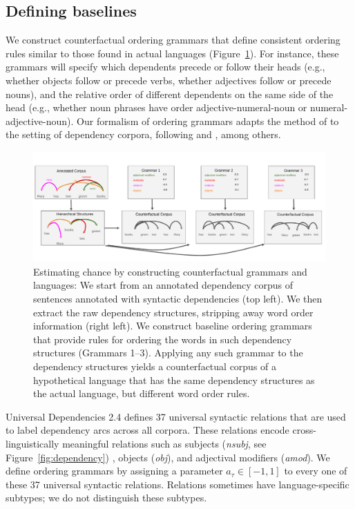 \subsection{Defining baselines}

We construct counterfactual ordering grammars that define consistent ordering rules similar to those found in actual languages (Figure~\ref{fig:grammars}).
For instance, these grammars will specify which dependents precede or follow their heads (e.g., whether objects follow or precede verbs, whether adjectives follow or precede nouns), and the relative order of different dependents on the same side of the head (e.g., whether noun phrases have order adjective-numeral-noun or numeral-adjective-noun). Our formalism of ordering grammars adapts the method of \citet{gildea-optimizing-2007,gildea-grammars-2010,gildea-human-2015} to the setting of dependency corpora, following \citet{futrell-large-scale-2015} and \citet{hahn2020universals}, among others.


\begin{figure}
\centering
\includegraphics[width=\textwidth]{figures-gdrive/counterfactual-languages.pdf}
\caption{Estimating chance by constructing counterfactual grammars and languages: We start from an annotated dependency corpus of sentences annotated with syntactic dependencies (top left). We then extract the raw dependency structures, stripping away word order information (right left).
We construct baseline ordering grammars that provide rules for ordering the words in such dependency structures (Grammars 1--3).
Applying any such grammar to the dependency structures yields a counterfactual corpus of a hypothetical language that has the same dependency structures as the actual language, but different word order rules.}\label{fig:grammars}
\end{figure}


Universal Dependencies 2.4 defines 37 universal syntactic relations that are used to label dependency arcs across all corpora.
These relations encode cross-linguistically meaningful relations such as subjects (\textit{nsubj}, see Figure~\ref{fig:dependency}) , objects (\textit{obj}), and adjectival modifiers (\textit{amod}).
We define ordering grammars by assigning a parameter $a_\tau \in [-1,1]$ to every one of these 37 universal syntactic relations.
Relations sometimes have language-specific subtypes; we do not distinguish these subtypes.

